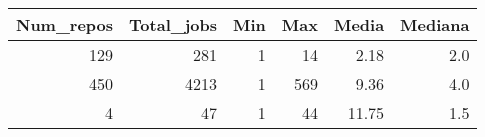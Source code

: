 \begin{tabular}{rrrrrr}
\toprule
 Num\_repos &  Total\_jobs &  Min &  Max &  Media &  Mediana \\
\midrule
       129 &         281 &    1 &   14 &   2.18 &      2.0 \\
       450 &        4213 &    1 &  569 &   9.36 &      4.0 \\
         4 &          47 &    1 &   44 &  11.75 &      1.5 \\
\bottomrule
\end{tabular}
